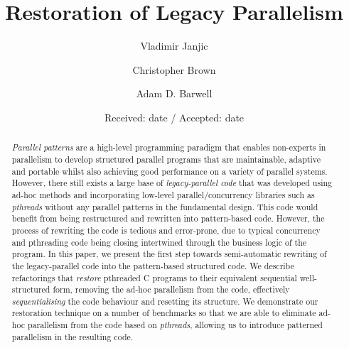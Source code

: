 \documentclass[smallextended]{svjour3}
\begin{document}
\title{Restoration of Legacy Parallelism}
%
%
\author{Vladimir Janjic         \and
	Christopher Brown \and 
	Adam D. Barwell \and
}



\date{Received: date / Accepted: date}

\maketitle
%
\begin{abstract}
    \emph{Parallel patterns} are a high-level programming paradigm that enables non-experts in parallelism to develop structured parallel programs that are maintainable, adaptive and portable whilst also achieving good performance on a variety of parallel systems. However, there still exists a large base of \emph{legacy-parallel code} that was developed using ad-hoc methods and incorporating low-level parallel/concurrency libraries such as \emph{pthreads} without any parallel patterns in the fundamental design. This code would benefit from being restructured and rewritten into pattern-based code. However, the process of rewriting the code is tedious and error-prone, due to typical concurrency and pthreading code being closing intertwined through the business logic of the program. In this paper, we present the first step towards semi-automatic rewriting of the legacy-parallel code into the pattern-based structured code. We describe refactorings that \emph{restore} pthreaded C programs to their equivalent sequential well-structured form, removing the ad-hoc parallelism from the code, effectively \emph{sequentialising} the code behaviour and resetting its structure. We demonstrate our restoration technique on a number of benchmarks so that we are able to eliminate ad-hoc parallelism from the code based on \emph{pthreads}, allowing us to introduce patterned parallelism in the resulting code.

\end{abstract}

%
%




\end{document}
